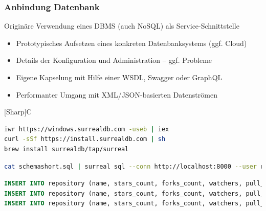 \documentclass[notitlepage, hidelinks]{article}
\begin{document}
\subsubsection{Anbindung Datenbank} \label{anbindungdatenbank}
Originäre Verwendung eines DBMS (auch NoSQL) als Service-Schnittstelle
\begin{itemize}
\item Prototypisches Aufsetzen eines konkreten Datenbanksystems (ggf. Cloud)
\item Details der Konfiguration und Administration – ggf. Probleme
\item Eigene Kapselung mit Hilfe einer WSDL, Swagger oder GraphQL
\item Performanter Umgang mit XML/JSON-basierten Datenströmen
\end{itemize}

{[Sharp]C}
\begin{lstlisting}[language=bash,frame=single,caption=CLI Kommandos zur lokalen Installation der Datenbank für Windows\, Linux und macOS,label=dbinstall]
iwr https://windows.surrealdb.com -useb | iex
curl -sSf https://install.surrealdb.com | sh
brew install surrealdb/tap/surreal
\end{lstlisting}

\begin{lstlisting}[language=bash,frame=single,caption=CLI Kommando zur Übertragung der Daten aus der Datei in Listing \ref{sqldbone},label=dbsetup]
cat schemashort.sql | surreal sql --conn http://localhost:8000 --user root --pass root --ns base --db base
\end{lstlisting}


\begin{lstlisting}[language=SQL,frame=single,caption=Ausschnitt der sql Setupdatei,label=sqldbone]
INSERT INTO repository (name, stars_count, forks_count, watchers, pull_requests, primary_language, languages_used, commit_count, created_at, licence) VALUES ('react', 159266, 30464, 8497, 2911, lang:JavaScript, [lang:JavaScript, lang:HTML, lang:CSS], 5562, '2013-05-24T16:15:54Z', 'MIT License');
INSERT INTO repository (name, stars_count, forks_count, watchers, pull_requests, primary_language, languages_used, commit_count, created_at, licence) VALUES ('scikit-learn', 38327, 18225, 4968, 1701, lang:Python, [lang:Python, lang:Cython, lang:HTML, lang:CSS], 4085, '2010-01-10T09:58:52Z', 'BSD-3-Clause License');
INSERT INTO repository (name, stars_count, forks_count, watchers, pull_requests, primary_language, languages_used, commit_count, created_at, licence) VALUES ('angular', 68521, 24536, 6779, 2197, lang:TypeScript, [lang:TypeScript, lang:JavaScript, lang:HTML, lang:CSS], 4248, '2014-09-18T16:12:01Z', 'MIT License');
\end{lstlisting}
\end{document}
